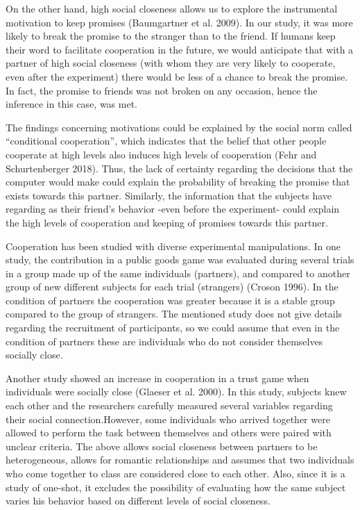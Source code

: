 \documentclass[smallextended]{svjour3}       %
\begin{document}
On the other hand, high social closeness allows us to explore the
instrumental motivation to keep promises (Baumgartner et al. 2009). In
our study, it was more likely to break the promise to the stranger than
to the friend. If humans keep their word to facilitate cooperation in
the future, we would anticipate that with a partner of high social
closeness (with whom they are very likely to cooperate, even after the
experiment) there would be less of a chance to break the promise. In
fact, the promise to friends was not broken on any occasion, hence the
inference in this case, was met.

The findings concerning motivations could be explained by the social
norm called ``conditional cooperation'', which indicates that the belief
that other people cooperate at high levels also induces high levels of
cooperation (Fehr and Schurtenberger 2018). Thus, the lack of certainty
regarding the decisions that the computer would make could explain the
probability of breaking the promise that exists towards this partner.
Similarly, the information that the subjects have regarding as their
friend's behavior -even before the experiment- could explain the high
levels of cooperation and keeping of promises towards this partner.

Cooperation has been studied with diverse experimental manipulations. In
one study, the contribution in a public goods game was evaluated during
several trials in a group made up of the same individuals (partners),
and compared to another group of new different subjects for each trial
(strangers) (Croson 1996). In the condition of partners the cooperation
was greater because it is a stable group compared to the group of
strangers. The mentioned study does not give details regarding the
recruitment of participants, so we could assume that even in the
condition of partners these are individuals who do not consider
themselves socially close.

Another study showed an increase in cooperation in a trust game when
individuals were socially close (Glaeser et al. 2000). In this study,
subjects knew each other and the researchers carefully measured several
variables regarding their social connection.However, some individuals
who arrived together were allowed to perform the task between themselves
and others were paired with unclear criteria. The above allows social
closeness between partners to be heterogeneous, allows for romantic
relationships and assumes that two individuals who come together to
class are considered close to each other. Also, since it is a study of
one-shot, it excludes the possibility of evaluating how the same subject
varies his behavior based on different levels of social closeness.
\end{document}
